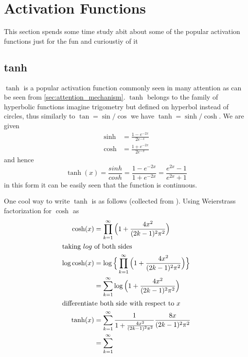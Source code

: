 \section{Activation Functions}\label{sec:activation_function}
This section spends some time study abit about some of the popular activation functions just for the fun and curioustiy of it
\subsection{tanh}\label{subsec:activation_function_tanh}
$\tanh$ is a popular activation function commonly seen in many attention as can be seen from \ref{sec:attention_mechanism}. $\tanh$ belongs to the family of hyperbolic functions imagine trigometry but defined on hyperbol instead of circles, thus similarly to $\tan = \sin/\cos$ we have $\tanh = \sinh/\cosh$. We are given
\begin{align*}
    \sinh &= \frac{1 - e^{-2x}}{2e^{-x}} \\
    \cosh &= \frac{1 + e^{-2x}}{2e^{-x}}
\end{align*}
and hence
\begin{equation}
    \tanh(x) = \frac{sinh}{cosh} = \frac{1-e^{-2x}}{1+e^{-2x}} = \frac{e^{2x}-1}{e^{2x}+1}
\end{equation}
in this form it can be easily seen that the function is continuous.

One cool way to write $\tanh$ is as follows (collected from \cite{tanh_mathexchange}). Using Weierstrass factorization for $\cosh$ as 
\begin{align*}
    \cosh(x) &= \prod_{k=1}^{\infty} \Big(1 + \frac{4x^2}{(2k-1)^2\pi^2} \Big)\\
\intertext{taking $log$ of both sides}
    \log \cosh(x) &= \log \Big\{ \prod_{k=1}^{\infty} \Big(1 + \frac{4x^2}{(2k-1)^2\pi^2} \Big) \Big\}  \\
    &= \sum_{k=1}^{\infty} \log \Big(1 + \frac{4x^2}{(2k-1)^2\pi^2} \Big) \\
\intertext{differentiate both side with respect to $x$}
    \tanh(x) &= \sum_{k=1}^{\infty} \frac{1}{1 + \frac{4x^2}{(2k-1)^2\pi^2}} \frac{8x}{(2k-1)^2\pi^2}\\
    &= \sum_{k=1}^{\infty}
\end{align*}



